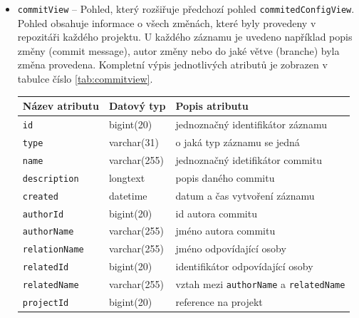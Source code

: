 \documentclass[czech,DP]{thesiskiv}
\begin{document}
\begin{itemize}
    \item \texttt{commitView} -- Pohled, který rozšiřuje předchozí pohled \texttt{commitedConfigView}. Pohled obsahuje informace o všech změnách, které byly provedeny v repozitáři každého projektu. U každého záznamu je uvedeno například popis změny (commit message), autor změny nebo do jaké větve (branche) byla změna provedena. Kompletní výpis jednotlivých atributů je zobrazen v tabulce číslo \ref{tab:commitview}.
    \begin{table}[]
        \begin{tabular}{|l|l|l|}
        \hline
        \textbf{Název atributu}& \textbf{Datový typ} & \textbf{Popis atributu}                                  \\ \hline \hline
        \texttt{id}             & bigint(20)      & jednoznačný identifikátor záznamu                             \\ \hline
        \texttt{type}			& varchar(31)  & o jaká typ záznamu se jedná                                                             \\ \hline
        \texttt{name}           & varchar(255)    & jednoznačný idetifikátor commitu                              \\ \hline
        \texttt{description}  	& longtext     & popis daného commitu                                             \\ \hline
        \texttt{created}        & datetime        & datum a čas vytvoření záznamu                                 \\ \hline
        \texttt{authorId}     	& bigint(20)   & id autora commitu                                                \\ \hline
        \texttt{authorName}     & varchar(255)    & jméno autora commitu                                          \\ \hline
        \texttt{relationName} 	& varchar(255) & jméno odpovídající osoby                                                             \\ \hline
        \texttt{relatedId}      & bigint(20)      & identifikátor odpovídající osoby                                                          \\ \hline
        \texttt{relatedName}  	& varchar(255) & vztah mezi \texttt{authorName} a \texttt{relatedName}                                                             \\ \hline
        \texttt{projectId}      & bigint(20)      & reference na projekt                                          \\ \hline

\end{tabular}
\end{table}
\end{itemize}
\end{document}
